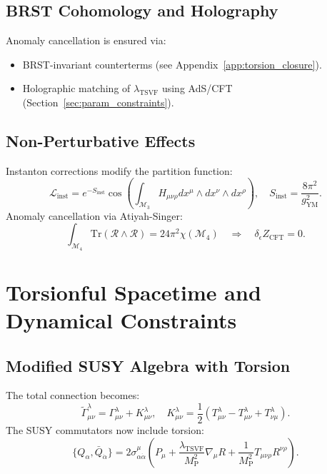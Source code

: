 \documentclass[12pt, onecolumn]{article}
\theoremstyle{definition}
\newcommand{\tsvf}{\lambda_{\mathrm{TSVF}}}
\newcommand{\Mp}{M_{\mathrm{P}}}
\numberwithin{equation}{section}
\begin{document}
\subsection{BRST Cohomology and Holography}
Anomaly cancellation is ensured via:
\begin{itemize}
\item BRST-invariant counterterms (see Appendix~\ref{app:torsion_closure}).
\item Holographic matching of \(\tsvf\) using AdS/CFT (Section~\ref{sec:param_constraints}).
\end{itemize}

\subsection{Non-Perturbative Effects}  
\label{subsec:instantons}

Instanton corrections modify the partition function:  
\begin{equation}
\mathcal{L}_{\text{inst}} = e^{-S_{\text{inst}}} \cos\left(\int_{\mathcal{M}_3} H_{\mu\nu\rho} dx^\mu \wedge dx^\nu \wedge dx^\rho\right), \quad S_{\text{inst}} = \frac{8\pi^2}{g_{\text{YM}}^2}.
\end{equation}  
Anomaly cancellation via Atiyah-Singer:  
\begin{equation}
\int_{\mathcal{M}_4} \mathrm{Tr}(\mathcal{R} \wedge \mathcal{R}) = 24\pi^2 \chi(\mathcal{M}_4) \quad \Rightarrow \quad \delta_\epsilon Z_{\text{CFT}} = 0.
\end{equation}


\section{Torsionful Spacetime and Dynamical Constraints}
\subsection{Modified SUSY Algebra with Torsion}
The total connection becomes:
\begin{equation}
\tilde{\Gamma}^\lambda_{\mu\nu} = \Gamma^\lambda_{\mu\nu} + K^\lambda_{\mu\nu}, \quad K^\lambda_{\mu\nu} = \frac{1}{2} \left(T^\lambda_{\mu\nu} - T_{\mu\nu}^\lambda + T_{\nu\mu}^\lambda\right).
\end{equation}
The SUSY commutators now include torsion:
\begin{equation}
\{Q_\alpha, \bar{Q}_{\dot{\alpha}}\} = 2 \sigma^\mu_{\alpha\dot{\alpha}} \left( P_\mu + \frac{\tsvf}{\Mp^2} \nabla_\mu R + \frac{1}{\Mp^2} T_{\mu\nu\rho} R^{\nu\rho} \right).
\end{equation}
\end{document}
